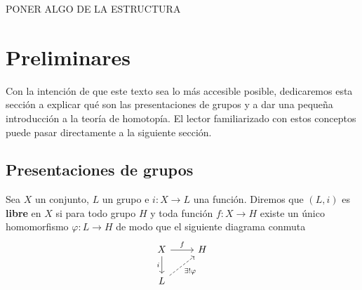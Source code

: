 \documentclass[bibtex, anon]{TEMat-article}
\begin{document}
PONER ALGO DE LA ESTRUCTURA
%

\section{Preliminares}

Con la intención de que este texto sea lo más accesible posible, dedicaremos esta sección a explicar qué son las presentaciones de grupos y a dar una pequeña introducción a la teoría de homotopía. El lector familiarizado con estos conceptos puede pasar directamente a la siguiente sección. 


\subsection{Presentaciones de grupos}
\begin{definicion}
	Sea $X$ un conjunto, $L$ un grupo e $i:X\to L$ una función. Diremos que $(L,i)$ es \textbf{libre} en $X$ si para todo grupo $H$ y toda función $f:X\to H$ existe un único homomorfismo $\varphi:L\to H$ de modo que el siguiente diagrama conmuta
	\[
	\begin{tikzcd}
	X\arrow[r, "f"]\arrow[d,"i"'] & H\\
	L\arrow[ur, dashed, "\exists!\varphi"']
	\end{tikzcd}
	\]
\end{definicion}
\end{document}
